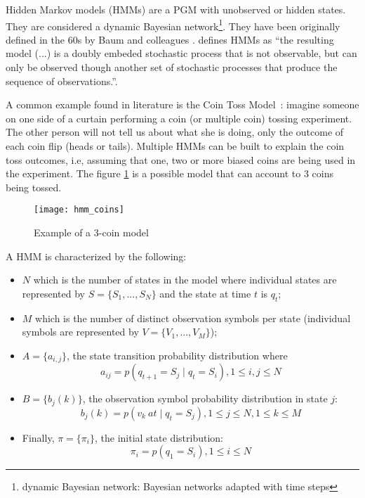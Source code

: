 Hidden Markov models (HMMs) are a PGM with unobserved or hidden states. They 
are considered a dynamic Bayesian network\footnote{dynamic Bayesian network: 
    Bayesian networks adapted with time steps}. They have been originally 
    defined 
in the 60s by Baum and colleagues \cite{Baum1966}. \cite{Rabiner1989} defines 
HMMs as ``the resulting model (...) is a doubly embeded stochastic process that 
is not observable, but can only be observed though another set of stochastic 
processes that produce the sequence of observations.''.

A common example found in literature is the Coin Toss Model~\cite{Rabiner1989}: 
imagine someone on one side of a curtain performing a coin (or multiple coin) 
tossing experiment. The other person will not tell us about what she is doing, 
only the outcome of each coin flip (heads or tails). Multiple HMMs can be built 
to explain the coin toss outcomes, i.e, assuming that one, two or more biased 
coins are being used in the experiment. The figure \ref{fig:hmm_coins} is a 
possible model that can account to 3 coins being tossed.

\begin{figure}[h]
    \begin{center}
        \leavevmode
        \texttt{[image: hmm\_coins]}
        \caption{Example of a 3-coin model \cite{Rabiner1989}}
        \label{fig:hmm_coins}
    \end{center}
\end{figure}

A HMM is characterized by the following:
\begin{itemize}
    \item $ N $ which is the number of states in the model where individual 
    states are represented by $ S = \{ S_{1}, ..., S_{N} \} $ and the state at 
    time $ t $ is $ q_{t} $;
    \item $ M $ which is the number of distinct observation symbols per state 
    (individual symbols are represented by $ V = \{V_{1}, ..., V_{M} \} $);
    \item $ A = \{ a_{i, j} \} $, the state transition probability 
    distribution where
    \begin{equation}
    a_{ij} = p(q_{t+1} = S_{j} \mid q_{t} = S_{i}), 1 \leq i, j \leq N
    \end{equation}
    \item $ B = \{ b_{j}(k) \} $, the observation symbol probability 
    distribution in state $ j $:
    \begin{equation}
    b_{j}(k) = p(v_{k}~at \mid q_{t} = S_{j}), 1 \leq j \leq N, 1 \leq k 
    \leq M
    \end{equation}
    \item Finally, $ \pi = \{ \pi_{i} \} $, the initial state distribution:
    \begin{equation}
    \pi_{i} = p(q_{1} = S_{i}), 1 \leq i \leq N
    \end{equation}
\end{itemize}

